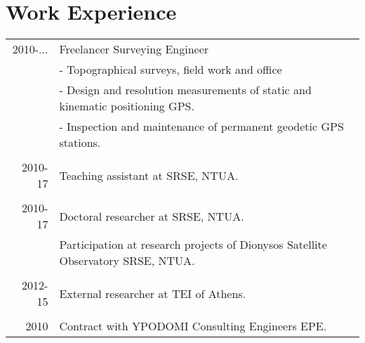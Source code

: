 \documentclass[a4paper]{Classes/cv_prof_en} %
\begin{document}
\section{Work Experience}
\begin{longtable}{r|p{15cm}}
\textsc{}2010-... & Freelancer Surveying Engineer\\ 
			& - Topographical surveys, field work and office \\
			& - Design and resolution measurements of static and kinematic positioning GPS.\\
			& - Inspection and maintenance of permanent geodetic GPS stations.\\
\multicolumn{2}{c}{} \\
2010-17 & Teaching assistant at SRSE, NTUA.\\
\multicolumn{2}{c}{} \\
2010-17 & Doctoral researcher at SRSE, NTUA.\\
		& Participation at research projects of Dionysos Satellite Observatory SRSE, NTUA.\\
\multicolumn{2}{c}{} \\
2012-15 & External researcher at TEI of Athens.\\
\multicolumn{2}{c}{} \\
2010 & Contract with YPODOMI Consulting Engineers EPE.\\


\end{longtable}
\end{document}
